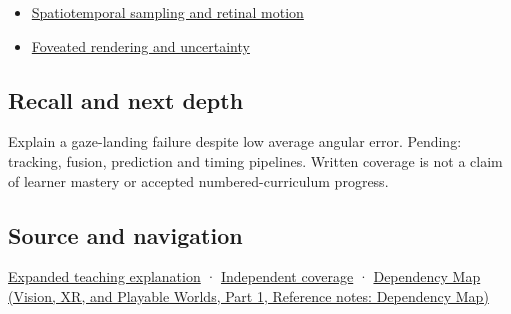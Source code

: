 \begin{itemize}
\tightlist
\item
  \hyperref[appendix-70895739febb]{Spatiotemporal sampling and retinal motion}
\item
  \hyperref[appendix-5878b813b732]{Foveated rendering and uncertainty}
\end{itemize}

\subsection{Recall and next depth}\label{appendix-a6f2c4fe1996-recall-and-next-depth}

\hypertarget{appendix-a6f2c4fe1996-recall-and-next-depth}{}

Explain a gaze-landing failure despite low average angular error. Pending: tracking, fusion, prediction and timing pipelines. Written coverage is not a claim of learner mastery or accepted numbered-curriculum progress.

\subsection{Source and navigation}\label{appendix-a6f2c4fe1996-source-and-navigation}

\hypertarget{appendix-a6f2c4fe1996-source-and-navigation}{}

\hyperref[04-visual-computing-ii-ch042-a-gaze-sample-needs-a-time-as-well-as-a-direction]{Expanded teaching explanation} · \hyperref[appendix-fd090d982a15-xr01---independent-seeing-and-representation-source]{Independent coverage} · \href{../07-Vision-XR-and-Playable-Worlds-P01/main.pdf\#appendix-4ad47bdd269a}{Dependency Map (Vision, XR, and Playable Worlds, Part 1, Reference notes: Dependency Map)}

